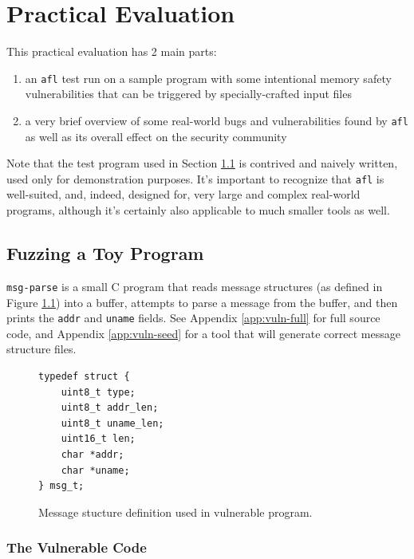 \chapter{Practical Evaluation}

This practical evaluation has 2 main parts:
\begin{enumerate}
    \item an \texttt{afl} test run on a sample program with some intentional
    memory safety vulnerabilities that can be triggered by specially-crafted
    input files
    \item a very brief overview of some real-world bugs and vulnerabilities
    found by \texttt{afl} as well as its overall effect on the security
    community
\end{enumerate}

Note that the test program used in Section \ref{sec:my-fuzz} is contrived and
naively written, used only for demonstration purposes. It's important to
recognize that \texttt{afl} is well-suited, and, indeed, designed for, very
large and complex real-world programs, although it's certainly also applicable
to much smaller tools as well.

\section{Fuzzing a Toy Program}
\label{sec:my-fuzz}

\texttt{msg-parse} is a small C program that reads
message structures (as defined in Figure \ref{fig:msg}) into a buffer,
attempts to parse a message from the buffer, and then prints the
\texttt{addr} and \texttt{uname} fields. See Appendix \ref{app:vuln-full}
for full source code, and Appendix \ref{app:vuln-seed} for a tool that
will generate correct message structure files. \\

\begin{figure}[H]
    \begin{lstlisting}[language={[ANSI]C}]
typedef struct {
    uint8_t type;
    uint8_t addr_len;
    uint8_t uname_len;
    uint16_t len;
    char *addr;
    char *uname;
} msg_t;
\end{lstlisting}
\caption{Message stucture definition used in vulnerable program.}
\label{fig:msg}
\end{figure}

\subsection{The Vulnerable Code}

